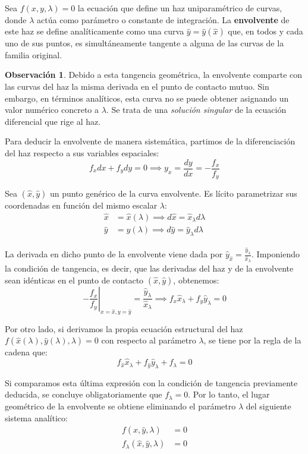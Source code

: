 \documentclass[11pt,a4paper]{article}
\theoremstyle{definition}
\newtheorem{remark}{Observación}[section]
\theoremstyle{plain}
\begin{document}
Sea $f(x,y,\lambda)=0$ la ecuación que define un haz uniparamétrico de curvas, donde $\lambda$ actúa como parámetro o constante de integración. La \textbf{envolvente} de este haz se define analíticamente como una curva $\hat{y} = \hat{y}(\hat{x})$ que, en todos y cada uno de sus puntos, es simultáneamente tangente a alguna de las curvas de la familia original.

\begin{remark}
Debido a esta tangencia geométrica, la envolvente comparte con las curvas del haz la misma derivada en el punto de contacto mutuo. Sin embargo, en términos analíticos, esta curva no se puede obtener asignando un valor numérico concreto a $\lambda$. Se trata de una \textit{solución singular} de la ecuación diferencial que rige al haz.
\end{remark}

Para deducir la envolvente de manera sistemática, partimos de la diferenciación del haz respecto a sus variables espaciales:
$$ f_x dx + f_y dy = 0 \implies y_x = \frac{dy}{dx} = -\frac{f_x}{f_y} $$

Sea $(\hat{x}, \hat{y})$ un punto genérico de la curva envolvente. Es lícito parametrizar sus coordenadas en función del mismo escalar $\lambda$:
\begin{align*}
    \hat{x} &= \hat{x}(\lambda) \implies d\hat{x} = \hat{x}_\lambda d\lambda \\
    \hat{y} &= \hat{y}(\lambda) \implies d\hat{y} = \hat{y}_\lambda d\lambda
\end{align*}

La derivada en dicho punto de la envolvente viene dada por $\hat{y}_{\hat{x}} = \frac{\hat{y}_\lambda}{\hat{x}_\lambda}$. Imponiendo la condición de tangencia, es decir, que las derivadas del haz y de la envolvente sean idénticas en el punto de contacto $(\hat{x}, \hat{y})$, obtenemos:
$$ -\left.\frac{f_x}{f_y}\right|_{x=\hat{x}, y=\hat{y}} = \frac{\hat{y}_\lambda}{\hat{x}_\lambda} \implies f_x \hat{x}_\lambda + f_y \hat{y}_\lambda = 0 $$

Por otro lado, si derivamos la propia ecuación estructural del haz $f(\hat{x}(\lambda), \hat{y}(\lambda), \lambda) = 0$ con respecto al parámetro $\lambda$, se tiene por la regla de la cadena que:
$$ f_{\hat{x}} \hat{x}_\lambda + f_{\hat{y}} \hat{y}_\lambda + f_\lambda = 0 $$

Si comparamos esta última expresión con la condición de tangencia previamente deducida, se concluye obligatoriamente que $f_\lambda = 0$. Por lo tanto, el lugar geométrico de la envolvente se obtiene eliminando el parámetro $\lambda$ del siguiente sistema analítico:
\begin{align*}
    f(\hat{x}, \hat{y}, \lambda) &= 0 \\
    f_\lambda(\hat{x}, \hat{y}, \lambda) &= 0
\end{align*}
\end{document}
